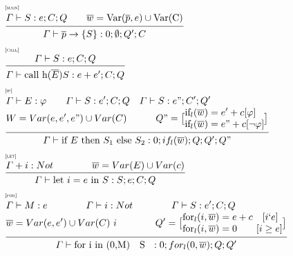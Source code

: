 \documentclass[../../main.tex]{subfiles}
\begin{document}
\begin{align}
    &\mathrule{main}{
        \begin{aligned} \varGamma \vdash S : e ; C; Q  \quad \quad
        \overline{w} = \text{Var}(\overline{p},e) \cup \text{Var(C)}
        \end{aligned}
        }{\varGamma \vdash \overline{p}  \rightarrow \{S\}: 0 ;\emptyset;Q';C} \\
    &\mathrule{call}{\varGamma \vdash S : e ; C; Q}{\varGamma \vdash \text{call h}(\overline{E}) S : e + e' ; C; Q}\\
    &\mathrule{if}{
    \begin{aligned}
        &\varGamma \vdash E : \varphi  \quad \quad \varGamma \vdash S : e'; C; Q \quad \varGamma \vdash S : e"; C'; Q'\\
        &W = Var(e, e', e") \cup Var(C) \quad \quad \quad Q" =\big[ \begin{aligned}
            &\text{if}_l(\overline{w})  = e'+c[\varphi]\\
            &\text{if}_l(\overline{w})  = e"+c[\neg \varphi]\\
        \end{aligned}\big] \\
    \end{aligned}    
    }{\varGamma \vdash \text{if } E \text{ then } S_1 \text{ else } S_2 : 0; if_l(\overline{w}); Q; Q'; Q"}\\
    &\mathrule{let}{\varGamma + i : Not \quad \quad \quad \quad \overline{w} = Var(E) \cup Var(c)}{\varGamma \vdash \text{let } i = e \text{ in } S : S;e ; C; Q}\\
    &\mathrule{for}{
        \begin{aligned}
            &\varGamma \vdash M: e \quad \quad \quad \quad \varGamma \vdash i : Not\quad \quad \quad \quad \varGamma \vdash S : e'; C; Q\\
            &\overline{w} = Var(e, e') \cup Var(C) \ i \quad \quad \quad \quad Q' = \big[ \begin{aligned}
                &\text{for}_l(i,\overline{w}) = e + c\quad [i \lq e]\\
                &\text{for}_l(i,\overline{w}) = 0 \quad \quad [i \geq e]\\
            \end{aligned}\big]
        \end{aligned}
    }{\varGamma \vdash \text{for i in (0,M) } \text{ { S } } : 0; for_l(0,\overline{w}); Q; Q'}\\
\end{align}
\end{document}
